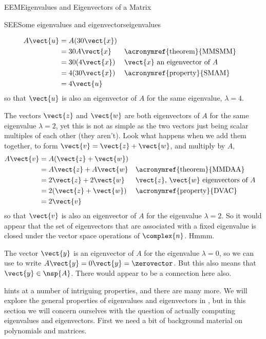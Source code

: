 \begin{subsect}{EEM}{Eigenvalues and Eigenvectors of a Matrix}
\begin{example}{SEE}{Some eigenvalues and eigenvectors}{eigenvalues}
\begin{para}
%
\begin{align*}
A\vect{u}
&=A(30\vect{x})\\
&=30A\vect{x}&&\text{\acronymref{theorem}{MMSMM}}\\
&=30(4\vect{x})&&\text{$\vect{x}$ an eigenvector of $A$}\\
&=4(30\vect{x})&&\text{\acronymref{property}{SMAM}}\\
&=4\vect{u}
\end{align*}
%
so that $\vect{u}$ is also an eigenvector of $A$ for the same eigenvalue, $\lambda=4$.\end{para}
%
\begin{para}The vectors $\vect{z}$ and $\vect{w}$ are both eigenvectors of $A$ for the same eigenvalue $\lambda=2$, yet this is not as simple as the two vectors just being scalar multiples of each other (they aren't).  Look what happens when we add them together, to form $\vect{v}=\vect{z}+\vect{w}$, and multiply by $A$,
%
\begin{align*}
A\vect{v}
&=A(\vect{z}+\vect{w})\\
&=A\vect{z}+A\vect{w}&&\text{\acronymref{theorem}{MMDAA}}\\
&=2\vect{z}+2\vect{w}&&\text{$\vect{z}$, $\vect{w}$ eigenvectors of $A$}\\
&=2(\vect{z}+\vect{w})&&\text{\acronymref{property}{DVAC}}\\
&=2\vect{v}
\end{align*}
%
so that $\vect{v}$ is also an eigenvector of $A$ for the eigenvalue $\lambda=2$.  So it would appear that the set of eigenvectors that are associated with a fixed eigenvalue is closed under the vector space operations of $\complex{n}$.  Hmmm.\end{para}
%
\begin{para}The vector $\vect{y}$ is an eigenvector of $A$ for the eigenvalue $\lambda=0$, so we can use  to write $A\vect{y}=0\vect{y}=\zerovector$.  But this also means that $\vect{y}\in\nsp{A}$.  There would appear to be a connection here also.\end{para}
%
\end{example}
%
%
\begin{para} hints at a number of intriguing properties, and there are many more.  We will explore the general properties of eigenvalues and eigenvectors in , but in this section we will concern ourselves with the question of actually computing eigenvalues and eigenvectors.  First we need a bit of background material on polynomials and matrices.\end{para}
%
\end{subsect}
